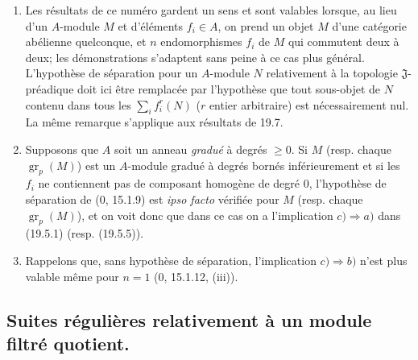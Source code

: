 \begin{remarks}[19.5.6]
\label{IV.19.5.6}
\begin{enumerate}
  \item[(i)] Les résultats de ce numéro gardent un sens et sont valables lorsque, au lieu d'un $A$-module $M$ et d'éléments $f_i\in A$, on prend un objet $M$ d'une catégorie abélienne quelconque, et $n$ endomorphismes $f_i$ de $M$ qui commutent deux à deux; les démonstrations s'adaptent sans peine à ce cas plus général. L'hypothèse de séparation pour un $A$-module $N$ relativement à la topologie $\mathfrak J$-préadique doit ici être remplacée par l'hypothèse que tout sous-objet de $N$ contenu dans tous les $\sum_i f_i^r(N)$ ($r$ entier arbitraire) est nécessairement nul. La même remarque s'applique aux résultats de 19.7.
  \item[(ii)] Supposons que $A$ soit un anneau \emph{gradué} à degrés $\geq0$. Si $M$ (resp. chaque $\operatorname{gr}_p(M)$) est un $A$-module gradué à degrés bornés inférieurement et si les $f_i$ ne contiennent pas de composant homogène de degré $0$, l'hypothèse de séparation de ($0$, 15.1.9) est \emph{ipso facto} vérifiée pour $M$ (resp. chaque $\operatorname{gr}_p(M)$), et on voit donc que dans ce cas on a l'implication $c)\Rightarrow a)$ dans (19.5.1) (resp. (19.5.5)).
  \item[(iii)] Rappelons que, sans hypothèse de séparation, l'implication $c)\Rightarrow b)$ n'est plus valable même pour $n=1$ ($0$, 15.1.12, (iii)).
\end{enumerate}
\end{remarks}

\subsection{Suites régulières relativement à un module filtré quotient.}

